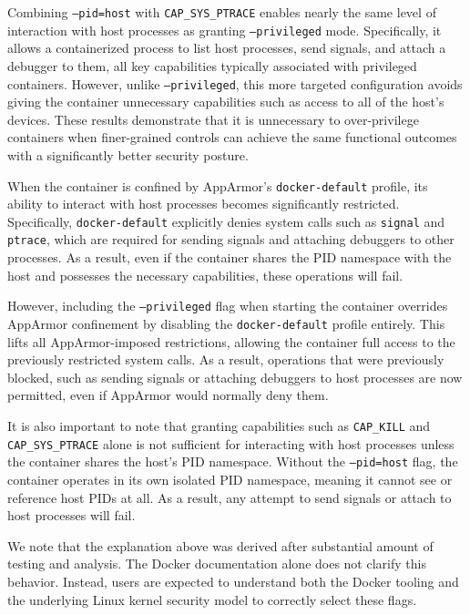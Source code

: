 Combining \texttt{--pid=host} with \texttt{CAP\_SYS\_PTRACE} enables nearly the same level of interaction with host processes as granting \texttt{--privileged} mode. Specifically, it allows a containerized process to list host processes, send signals, and attach a debugger to them, all key capabilities typically associated with privileged containers. However, unlike \texttt{--privileged}, this more targeted configuration avoids giving the container unnecessary capabilities such as access to all of the host's devices. These results demonstrate that it is unnecessary to over-privilege containers when finer-grained controls can achieve the same functional outcomes with a significantly better security posture.

When the container is confined by AppArmor's \texttt{docker-default} profile, its ability to interact with host processes becomes significantly restricted. Specifically, \texttt{docker-default} explicitly denies system calls such as \texttt{signal} and \texttt{ptrace}, which are required for sending signals and attaching debuggers to other processes. As a result, even if the container shares the PID namespace with the host and possesses the necessary capabilities, these operations will fail. 

However, including the \texttt{--privileged} flag when starting the container overrides AppArmor confinement by disabling the \texttt{docker-default} profile entirely. This lifts all AppArmor-imposed restrictions, allowing the container full access to the previously restricted system calls. As a result, operations that were previously blocked, such as sending signals or attaching debuggers to host processes are now permitted, even if AppArmor would normally deny them.

It is also important to note that granting capabilities such as \texttt{CAP\_KILL} and \texttt{CAP\_SYS\_PTRACE} alone is not sufficient for interacting with host processes unless the container shares the host’s PID namespace. Without the \texttt{--pid=host} flag, the container operates in its own isolated PID namespace, meaning it cannot see or reference host PIDs at all. As a result, any attempt to send signals or attach to host processes will fail.

We note that the explanation above was derived after substantial amount of testing and analysis. The Docker documentation alone does not clarify this behavior. Instead, users are expected to understand both the Docker tooling and the underlying Linux kernel security model to correctly select these flags. 


